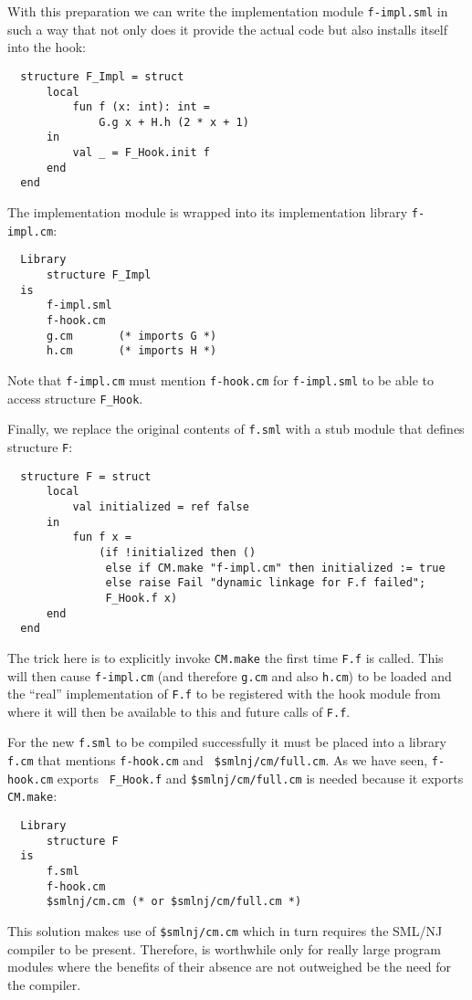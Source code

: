\documentclass[titlepage,letterpaper]{article}
\begin{document}
With this preparation we can write the implementation module {\tt f-impl.sml}
in such a way that not only does it provide the actual
code but also installs itself into the hook:
\begin{verbatim}
  structure F_Impl = struct
      local
          fun f (x: int): int =
              G.g x + H.h (2 * x + 1)
      in
          val _ = F_Hook.init f
      end
  end
\end{verbatim}
\noindent The implementation module is wrapped into its implementation
library {\tt f-impl.cm}:
\begin{verbatim}
  Library
      structure F_Impl
  is
      f-impl.sml
      f-hook.cm
      g.cm       (* imports G *)
      h.cm       (* imports H *)
\end{verbatim}
\noindent Note that {\tt f-impl.cm} must mention {\tt f-hook.cm} for
{\tt f-impl.sml} to be able to access structure {\tt F\_Hook}.

Finally, we replace the original contents of {\tt f.sml} with a stub
module that defines structure {\tt F}:
\begin{verbatim}
  structure F = struct
      local
          val initialized = ref false
      in
          fun f x =
              (if !initialized then ()
               else if CM.make "f-impl.cm" then initialized := true
               else raise Fail "dynamic linkage for F.f failed";
               F_Hook.f x)
      end
  end
\end{verbatim}
\noindent The trick here is to explicitly invoke {\tt CM.make} the
first time {\tt F.f} is called.  This will then cause {\tt f-impl.cm}
(and therefore {\tt g.cm} and also {\tt h.cm}) to be loaded and the
``real'' implementation of {\tt F.f} to be registered with the hook
module from where it will then be available to this and future calls
of {\tt F.f}.

For the new {\tt f.sml} to be compiled successfully it must be placed
into a library {\tt f.cm} that mentions {\tt f-hook.cm} and {\tt
\$smlnj/cm/full.cm}.  As we have seen, {\tt f-hook.cm} exports {\tt
F\_Hook.f} and {\tt \$smlnj/cm/full.cm} is needed because it exports
{\tt CM.make}:

\begin{verbatim}
  Library
      structure F
  is
      f.sml
      f-hook.cm
      $smlnj/cm.cm (* or $smlnj/cm/full.cm *)
\end{verbatim}

  This solution makes use of {\tt \$smlnj/cm.cm}
which in turn requires the SML/NJ compiler to be present.  Therefore,
is worthwhile only for really large program modules where the benefits
of their absence are not outweighed be the need for the compiler.
\end{document}
